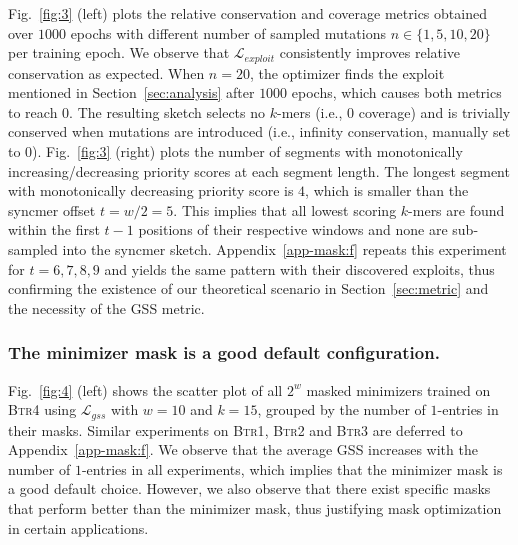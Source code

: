 \noindent Fig.~\ref{fig:3} (left) plots the relative conservation and coverage metrics obtained over $1000$ epochs with different number of sampled mutations $n \in \{1,5,10,20\}$ per training epoch. We observe that $\mathcal{L}_{exploit}$ consistently improves relative conservation as expected. When $n=20$, the optimizer finds the exploit mentioned in Section~\ref{sec:analysis} after $1000$ epochs, which causes both metrics to reach $0$. The resulting sketch selects no $k$-mers (i.e., $0$ coverage) and is trivially conserved when mutations are introduced (i.e., infinity conservation, manually set to $0$). Fig.~\ref{fig:3} (right) plots the number of segments with monotonically increasing/decreasing priority scores at each segment length. The longest segment with monotonically decreasing priority score is $4$, which is smaller than the syncmer offset $t=w/2=5$. This implies that all lowest scoring $k$-mers are found within the first $t-1$ positions of their respective windows and none are sub-sampled into the syncmer sketch. Appendix~\ref{app-mask:f} repeats this experiment for $t=6,7,8,9$ and yields the same pattern with their discovered exploits, thus confirming the existence of our theoretical scenario in Section~\ref{sec:metric} and the necessity of the GSS metric.

\subsubsection{The minimizer mask is a good default configuration.} Fig.~\ref{fig:4} (left) shows the scatter plot of all $2^w$ masked minimizers trained on \textsc{Btr4} using $\mathcal{L}_{gss}$ with $w=10$ and $k=15$, grouped by the number of $1$-entries in their masks. Similar experiments on \textsc{Btr1}, \textsc{Btr2} and \textsc{Btr3} are deferred to Appendix~\ref{app-mask:f}. We observe that the average GSS increases with the number of $1$-entries in all experiments, which implies that the minimizer mask is a good default choice. However, we also observe that there exist specific masks that perform better than the minimizer mask, thus justifying mask optimization in certain applications.

